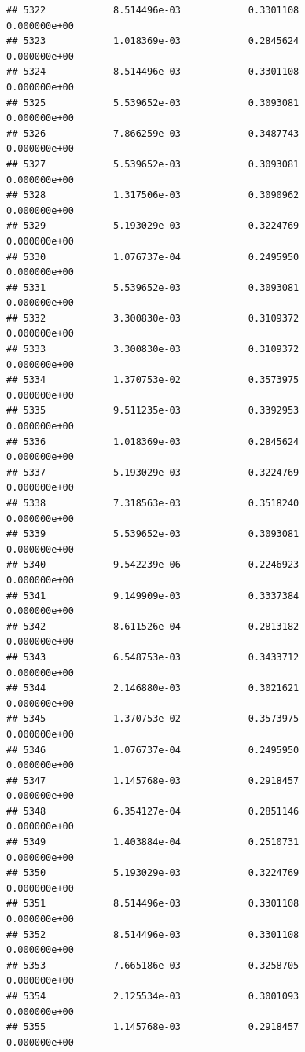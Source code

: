 \documentclass[
]{article}
\begin{document}
\begin{verbatim}
## 5322            8.514496e-03            0.3301108            0.000000e+00
## 5323            1.018369e-03            0.2845624            0.000000e+00
## 5324            8.514496e-03            0.3301108            0.000000e+00
## 5325            5.539652e-03            0.3093081            0.000000e+00
## 5326            7.866259e-03            0.3487743            0.000000e+00
## 5327            5.539652e-03            0.3093081            0.000000e+00
## 5328            1.317506e-03            0.3090962            0.000000e+00
## 5329            5.193029e-03            0.3224769            0.000000e+00
## 5330            1.076737e-04            0.2495950            0.000000e+00
## 5331            5.539652e-03            0.3093081            0.000000e+00
## 5332            3.300830e-03            0.3109372            0.000000e+00
## 5333            3.300830e-03            0.3109372            0.000000e+00
## 5334            1.370753e-02            0.3573975            0.000000e+00
## 5335            9.511235e-03            0.3392953            0.000000e+00
## 5336            1.018369e-03            0.2845624            0.000000e+00
## 5337            5.193029e-03            0.3224769            0.000000e+00
## 5338            7.318563e-03            0.3518240            0.000000e+00
## 5339            5.539652e-03            0.3093081            0.000000e+00
## 5340            9.542239e-06            0.2246923            0.000000e+00
## 5341            9.149909e-03            0.3337384            0.000000e+00
## 5342            8.611526e-04            0.2813182            0.000000e+00
## 5343            6.548753e-03            0.3433712            0.000000e+00
## 5344            2.146880e-03            0.3021621            0.000000e+00
## 5345            1.370753e-02            0.3573975            0.000000e+00
## 5346            1.076737e-04            0.2495950            0.000000e+00
## 5347            1.145768e-03            0.2918457            0.000000e+00
## 5348            6.354127e-04            0.2851146            0.000000e+00
## 5349            1.403884e-04            0.2510731            0.000000e+00
## 5350            5.193029e-03            0.3224769            0.000000e+00
## 5351            8.514496e-03            0.3301108            0.000000e+00
## 5352            8.514496e-03            0.3301108            0.000000e+00
## 5353            7.665186e-03            0.3258705            0.000000e+00
## 5354            2.125534e-03            0.3001093            0.000000e+00
## 5355            1.145768e-03            0.2918457            0.000000e+00

\end{verbatim}
\end{document}
